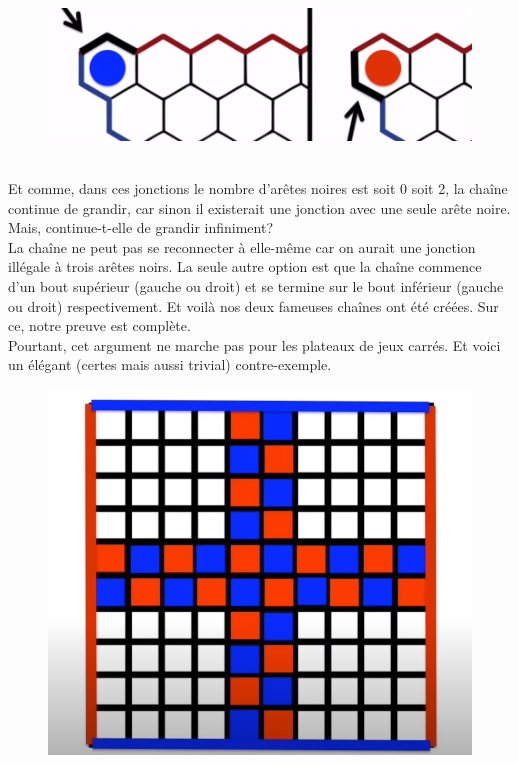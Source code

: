 \documentclass{article}
\begin{document}
\begin{figure}[ht]
    \centering
    \includegraphics[scale=0.5]{cornerjoint.png}
\end{figure}
\\
Et comme, dans ces jonctions le nombre d'arêtes noires est soit 0 soit 2, la chaîne continue de grandir, car sinon il existerait une jonction avec une seule arête noire. Mais, continue-t-elle de grandir infiniment?\\
La chaîne ne peut pas se reconnecter à elle-même car on aurait une jonction illégale à trois arêtes noirs. La seule autre option est que la chaîne commence d'un bout supérieur (gauche ou droit) et se termine sur le bout inférieur (gauche ou droit) respectivement. Et voilà nos deux fameuses chaînes ont été créées. Sur ce, notre preuve est complète.\\
Pourtant, cet argument ne marche pas pour les plateaux de jeux carrés. Et voici un élégant (certes mais aussi trivial) contre-exemple.\\
\begin{figure}[h]
    \centering
    \includegraphics[scale=0.5]{squaregrid.png}
\end{figure}
\end{document}
